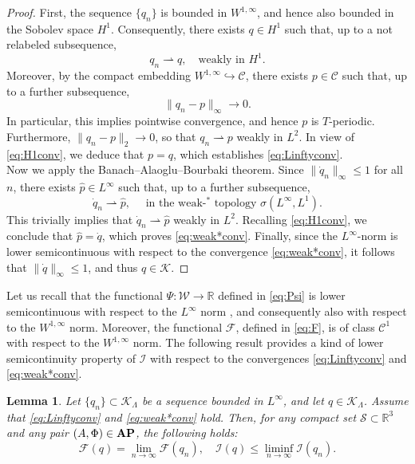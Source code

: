 \documentclass{article}
\newcommand{\boC}{\mathcal{C}}
\newcommand{\boK}{\mathcal{K}}
\newcommand{\boI}{\mathcal{I}}
\newcommand{\R}{\mathbb{R}}
\newcommand{\boW}{\mathcal{W}}
\newcommand{\boF}{\mathcal{F}}
\newcommand{\boS}{\mathcal{S}}
\newcommand{\AP}{\textnormal{\textbf{AP}}}
\newtheorem{lemma}{Lemma}[section]
\theoremstyle{definition}
\begin{document}
\begin{proof}
    First, the sequence $\{q_n\}$ is bounded in $W^{1,\infty}$, and hence also bounded in the Sobolev space $H^1$. Consequently, there exists $q\in H^1$ such that, up to a not relabeled subsequence,
    \begin{equation}
        q_n\rightharpoonup q,\quad\text{weakly in }H^1. \label{eq:H1conv}
    \end{equation}
    Moreover, by the compact embedding $W^{1,\infty} \hookrightarrow \boC$, there exists $p \in \boC$ such that, up to a further subsequence,
    \begin{equation}\label{infconv}
        \|q_n-p\|_\infty\to 0.
    \end{equation}
    In particular, this implies pointwise convergence, and hence $p$ is $T$-periodic. Furthermore,  $\|q_n-p\|_2\to 0$, so that $q_n\rightharpoonup p$ weakly in $L^2$. In view of \eqref{eq:H1conv}, we deduce that $p=q$, which establishes \eqref{eq:Linftyconv}.\\
    Now we apply the Banach--Alaoglu--Bourbaki theorem. Since $\|\dot{q}_n\|_\infty\leq 1$ for all $n$, there exists $\hat{p}\in L^\infty$ such that, up to a further subsequence,
    \[\dot{q}_n\rightharpoonup \hat p,\quad\text{ in the weak-$^*$ topology }\sigma(L^\infty,L^1).\]
    This trivially implies that $\dot{q}_n\rightharpoonup \hat p$ weakly in $L^2$. Recalling \eqref{eq:H1conv}, we conclude that $\hat p=\dot{q}$, which proves \eqref{eq:weak*conv}. Finally, since the $L^\infty$-norm is lower semicontinuous with respect to the convergence \eqref{eq:weak*conv}, it follows that $\|\dot{q}\|_\infty\leq 1$, and thus $q\in\boK$.
\end{proof}


Let us recall that the functional $\Psi:\boW\to\R$ defined in \eqref{eq:Psi} is lower semicontinuous with respect to the $L^\infty$ norm \cite[Proposition 1]{BerJebMaw}, and consequently also with respect to the $W^{1,\infty}$ norm. Moreover, the functional $\boF$, defined in \eqref{eq:F}, is of class $\boC^1$ with respect to the $W^{1,\infty}$ norm. The following result provides a kind of lower semicontinuity property of $\boI$ with respect to the convergences \eqref{eq:Linftyconv} and \eqref{eq:weak*conv}.

\begin{lemma}\label{lemma:wlsc}
    Let $\{q_n\}\subset \boK_\Lambda$ be a sequence bounded in $L^\infty$, and let $q\in\boK_\Lambda$. Assume that \eqref{eq:Linftyconv} and \eqref{eq:weak*conv} hold. Then, for any compact set $\boS\subset\R^3$ and any pair $(A,\Phi)\in\AP$, the following holds:
    \begin{equation}\label{eq:Ilsc}
        \boF(q)=\lim_{n\to\infty}\boF(q_n),\quad \boI(q)\leq\liminf_{n\to\infty}\boI(q_n).
    \end{equation}
\end{lemma}
\end{document}
